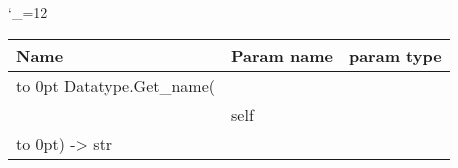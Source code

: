 \begingroup \catcode`\_=12 \tt
\begin{tabular}{lll}
\toprule
\textrm{Name}&\textrm{Param name}&\textrm{param type}\\
\midrule
\hbox to 0pt {Datatype.Get_name(\hss}\\
& self\\
\hbox to 0pt{) -> str\hss}\\
\bottomrule
\end{tabular}
\endgroup
